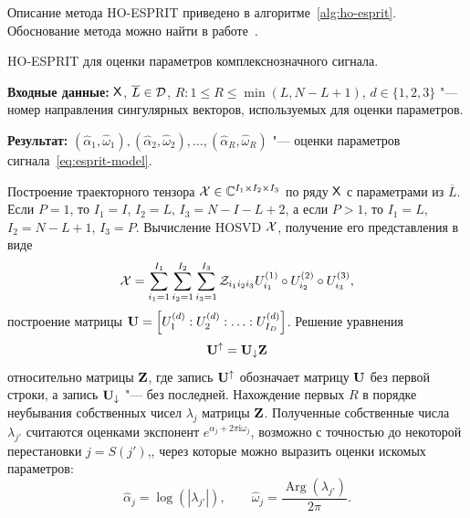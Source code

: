 \documentclass[specialist,
  substylefile=spbu_report.rtx,
subf,href,colorlinks=true, 12pt]{disser}
\theoremstyle{plain}
\theoremstyle{definition}
\theoremstyle{remark}
\newcommand{\Input}{\textbf{Входные данные: }}
\newcommand{\Output}{\textbf{Результат: }}
\newcommand{\iu}{\mathrm{i}}
\begin{document}
Описание метода HO-ESPRIT приведено в алгоритме~\ref{alg:ho-esprit}.
Обоснование метода можно найти в работе~\cite{hosvd-hooi-separation}.
\begin{algorithm}[!ht]
  \caption{HO-ESPRIT для оценки параметров комплекснозначного сигнала.}
  \label{alg:ho-esprit}
  \Input $\mathsf{X}$, $\overline{L} \in \mathcal{D}$, $R: 1 \leqslant R\leqslant \min(L, N-L+1)$,
  $d\in \{1, 2, 3\}$ "--- номер направления сингулярных векторов,
  используемых для оценки параметров.

  \Output $\left(\widehat{\alpha}_1, \widehat{\omega}_1\right),
  \left(\widehat{\alpha}_2, \widehat{\omega}_2\right), \ldots,
  \left(\widehat{\alpha}_R, \widehat{\omega}_R\right)$ "--- оценки параметров
  сигнала~\eqref{eq:esprit-model}.
  \begin{algorithmic}[1]
    \State Построение траекторного тензора $\mathcal{X}\in \mathbb{C}^{I_1\times I_2 \times I_3}$
    по ряду $\mathsf{X}$ с параметрами из $\overline{L}$.
    Если $P=1$, то $I_1=I$, $I_2=L$, $I_3=N-I-L+2$, а если
    $P>1$, то $I_1=L$, $I_2=N-L+1$, $I_3=P$.
    \State Вычисление HOSVD $\mathcal{X}$, получение его представления в виде
    \[
      \mathcal{X} = \sum_{i_1=1}^{I_1} \sum_{i_2=1}^{I_2} \sum_{i_3=1}^{I_3}
      \mathcal{Z}_{i_1 i_2 i_3} U_{i_1}^{(1)}\circ U_{i_2}^{(2)} \circ U_{i_3}^{(3)},
    \]
    построение матрицы $\mathbf{U} = \left[U_1^{(d)}:U_2^{(d)}:\ldots: U_{I_D}^{(d)}\right]$.
    \State Решение уравнения
    \[
      \mathbf{U}^{\uparrow}=\mathbf{U}_{\downarrow}\mathbf{Z}
    \]
    относительно матрицы $\mathbf{Z}$, где запись $\mathbf{U}^{\uparrow}$ обозначает матрицу $\mathbf{U}$ без первой строки,
    а запись $\mathbf{U}_{\downarrow}$ "--- без последней.
    \State Нахождение первых $R$ в порядке неубывания собственных чисел $\lambda_j$ матрицы $\mathbf{Z}$.
    Полученные собственные числа $\lambda_{j'}$ считаются оценками
    экспонент $e^{\alpha_j + 2\pi\iu \omega_j}$, возможно с точностью до некоторой перестановки
    $j = S (j')$,, через которые можно выразить
    оценки искомых параметров:
    \[
      \widehat{\alpha}_j = \log\left(\left|\lambda_{j'}\right|\right), \qquad
      \widehat{\omega}_j = \frac{\operatorname{Arg}\left(\lambda_{j'}\right)}{2 \pi}.
    \]
  \end{algorithmic}
\end{algorithm}
\end{document}
